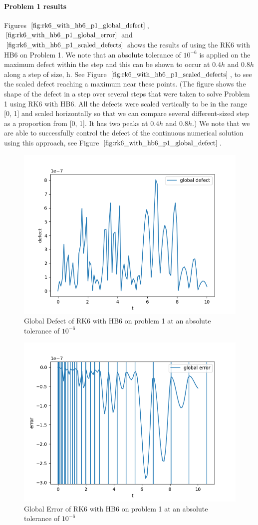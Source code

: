 \documentclass{article}
\begin{document}
\paragraph{Problem 1 results}
Figures $\ref{fig:rk6_with_hb6_p1_global_defect}$, $\ref{fig:rk6_with_hb6_p1_global_error}$ and $\ref{fig:rk6_with_hb6_p1_scaled_defects}$ shows the results of using the RK6 with HB6 on Problem 1. We note that an absolute tolerance of $10^{-6}$ is applied on the maximum defect within the step and this can be shown to occur at $0.4h$ and $0.8h$ along a step of size, h. See Figure $\ref{fig:rk6_with_hb6_p1_scaled_defects}$, to see the scaled defect reaching a maximum near these points. (The figure shows the shape of the defect in a step over several steps that were taken to solve Problem 1 using RK6 with HB6. All the defects were scaled vertically to be in the range [0, 1] and scaled horizontally so that we can compare several different-sized step as a proportion from [0, 1]. It has two peaks at $0.4h$ and $0.8h$.) We note that we are able to successfully control the defect of the continuous numerical solution using this approach, see Figure $\ref{fig:rk6_with_hb6_p1_global_defect}$. 

\begin{figure}[H]
\centering
\includegraphics[width=0.7\linewidth]{./figures/rk6_with_hb6_p1_global_defect}
\caption{Global Defect of RK6 with HB6 on problem 1 at an absolute tolerance of $10^{-6}$}
\label{fig:rk6_with_hb6_p1_global_defect}
\end{figure}

\begin{figure}[H]
\centering
\includegraphics[width=0.7\linewidth]{./figures/rk6_with_hb6_p1_global_error}
\caption{Global Error of RK6 with HB6 on problem 1 at an absolute tolerance of $10^{-6}$}
\label{fig:rk6_with_hb6_p1_global_error}
\end{figure}
\end{document}
